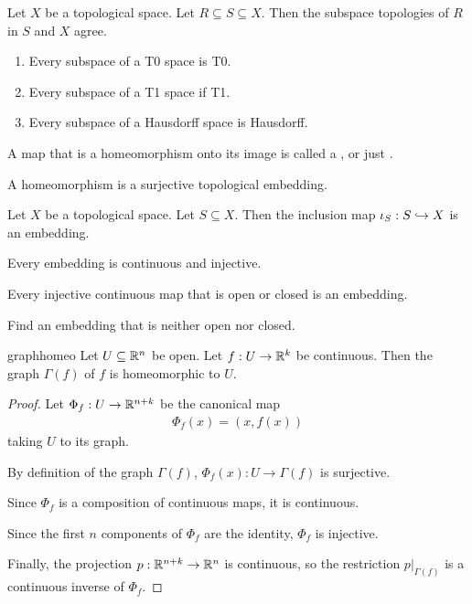 \begin{exercise}
	Let $X$ be a topological space. Let $R \subseteq S \subseteq X$. Then the subspace topologies of $R$ in $S$ and $X$ agree.
\end{exercise}
\begin{exercise}
	\phantom{}
	\begin{enumerate}
		\item Every subspace of a T0 space is T0.
		\item Every subspace of a T1 space if T1.
		\item Every subspace of a Hausdorff space is Hausdorff.
	\end{enumerate}
\end{exercise}
\begin{importantdefinition}{}{}
	A map that is a homeomorphism onto its image is called a , or just .
\end{importantdefinition}
\begin{exercise}
	A homeomorphism is a surjective topological embedding.
\end{exercise}
\begin{exercise}
	Let $X$ be a topological space. Let $S \subseteq X$. Then the inclusion map $\iota_S : S \hookrightarrow X$ is an embedding.
\end{exercise}
\begin{exercise}
	Every embedding is continuous and injective.
\end{exercise}
\begin{exercise}
	Every injective continuous map that is open or closed is an embedding.
\end{exercise}
\begin{exercise}
	Find an embedding that is neither open nor closed.
\end{exercise}
\begin{importanttheorem}{}{graphhomeo}
	Let $U \subseteq \mathbb{R}^n$ be open. Let $f : U \to \mathbb{R}^k$ be continuous. Then the graph $\Gamma(f)$ of $f$ is homeomorphic to $U$.
\end{importanttheorem}
\begin{proof}
	Let $\Phi_f : U \to \mathbb{R}^{n+k}$ be the canonical map
	\begin{align*}
		\Phi_f(x) = (x,f(x))
	\end{align*}
	taking $U$ to its graph.
	
	By definition of the graph $\Gamma(f)$, $\Phi_f(x) : U \to \Gamma(f)$ is surjective.
	
	Since $\Phi_f$ is a composition of continuous maps, it is continuous. 
	
	Since the first $n$ components of $\Phi_f$ are the identity, $\Phi_f$ is injective. 
	
	Finally, the projection $p : \mathbb{R}^{n+k} \to \mathbb{R}^n$ is continuous, so the restriction $p|_{\Gamma(f)}$ is a continuous inverse of $\Phi_f$.
\end{proof}


